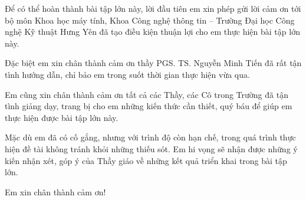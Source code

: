 
Để có thể hoàn thành bài tập lớn này, lời đầu tiên em xin phép gửi lời cảm ơn tới bộ môn Khoa học máy tính, Khoa
Công nghệ thông tin -- Trường Đại học Công nghệ Kỹ thuật Hưng Yên đã tạo điều kiện thuận lợi cho em thực hiện bài tập lớn
này.

Đặc biệt em xin chân thành cảm ơn thầy PGS. TS. Nguyễn Minh Tiến đã rất tận tình hướng dẫn, chỉ bảo em trong suốt thời
gian thực hiện vừa qua.

Em cũng xin chân thành cảm ơn tất cả các Thầy, các Cô trong Trường đã tận tình giảng dạy, trang bị cho em những kiến
thức cần thiết, quý báu để giúp em thực hiện được bài tập lớn này.

Mặc dù em đã có cố gắng, nhưng với trình độ còn hạn chế, trong quá trình thực hiện đề tài không tránh khỏi những thiếu
sót. Em hi vọng sẽ nhận được những ý kiến nhận xét, góp ý của Thầy giáo về những kết quả triển khai trong bài tập lớn.

Em xin chân thành cảm ơn!
